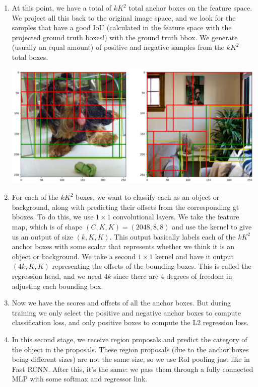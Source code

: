 \documentclass{article}
\theoremstyle{definition}
\theoremstyle{remark}
\theoremstyle{definition}
\begin{document}
\begin{enumerate}
          \item At this point, we have a total of $k K^2$ total anchor boxes on the feature space. We project all this back to the original image space, and we look for the samples that have a good IoU (calculated in the feature space with the projected ground truth boxes!) with the ground truth bbox. We generate (usually an equal amount) of positive and negative samples from the $k K^2$ total boxes. 
          \begin{center}
              \includegraphics[scale=0.2]{Images/gt_sampling.png}
          \end{center}
          
          \item For each of the $k K^2$ boxes, we want to classify each as an object or background, along with predicting their offsets from the corresponding gt bboxes. To do this, we use $1 \times 1$ convolutional layers. We take the feature map, which is of shape $(C, K, K) = (2048, 8, 8)$ and use the kernel to give us an output of size $(k, K, K)$. This output basically labels each of the $k K^2$ anchor boxes with some scalar that represents whether we think it is an object or background. We take a second $1 \times 1$ kernel and have it output $(4k, K, K)$ representing the offsets of the bounding boxes. This is called the regression head, and we need $4k$ since there are 4 degrees of freedom in adjusting each bounding box. 
          
          \item Now we have the scores and offsets of all the anchor boxes. But during training we only select the positive and negative anchor boxes to compute classification loss, and only positive boxes to compute the L2 regression loss. 

          \item In this second stage, we receive region proposals and predict the category of the object in the proposals. These region proposals (due to the anchor boxes being different sizes) are not the same size, so we use RoI pooling just like in Fast RCNN. After this, it's the same: we pass them through a fully connected MLP with some softmax and regressor link. 


\end{enumerate}
\end{document}
